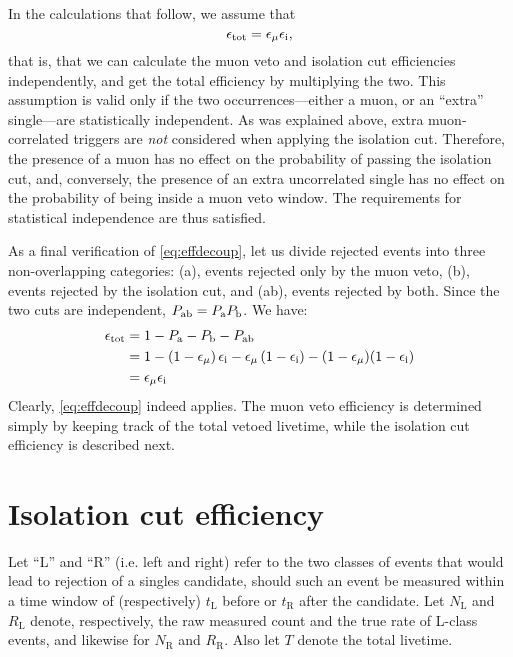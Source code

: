 \documentclass[../thesis.tex]{subfiles}
\begin{document}
In the calculations that follow, we assume that
\begin{equation}
  \label{eq:effdecoup}
  \epsilon_\mathrm{tot} = \epsilon_\mathrm{\mu} \epsilon_\mathrm{i},
\end{equation}
that is, that we can calculate the muon veto and isolation cut efficiencies
independently, and get the total efficiency by multiplying the two. This
assumption is valid only if the two occurrences---either a muon, or an ``extra''
single---are statistically independent. As was explained above, extra
muon-correlated triggers are \emph{not} considered when applying the isolation
cut. Therefore, the presence of a muon has no effect on the probability of
passing the isolation cut, and, conversely, the presence of an extra
uncorrelated single has no effect on the probability of being inside a muon veto
window. The requirements for statistical independence are thus satisfied.

As a final verification of \autoref{eq:effdecoup}, let us divide rejected events
into three non-overlapping categories: (a), events rejected only by the muon
veto, (b), events rejected by the isolation cut, and (ab), events rejected by
both. Since the two cuts are independent, $P_\mathrm{ab} = P_\mathrm{a}P_\mathrm{b}$. We have:
\begin{align*}
  \epsilon_\mathrm{tot} &= 1 - P_\mathrm{a} - P_\mathrm{b} - P_\mathrm{ab} \\
        &= 1 - (1-\epsilon_\mathrm{\mu})\,\epsilon_\mathrm{i} - \epsilon_\mathrm{\mu}\,(1-\epsilon_\mathrm{i}) - (1-\epsilon_\mathrm{\mu})(1-\epsilon_\mathrm{i}) \\
        &= \epsilon_\mathrm{\mu} \epsilon_\mathrm{i}
\end{align*}
Clearly, \autoref{eq:effdecoup} indeed applies. The muon veto efficiency is
determined simply by keeping track of the total vetoed livetime, while the
isolation cut efficiency is described next.


\section{Isolation cut efficiency}
\label{sec:isolcuteff}

\newcommand\NL{\ensuremath{N_{\mathrm{L}}}}
\newcommand\RL{\ensuremath{R_{\mathrm{L}}}}
\newcommand\tL{\ensuremath{t_{\mathrm{L}}}}
\newcommand\NR{\ensuremath{N_{\mathrm{R}}}}
\newcommand\RR{\ensuremath{R_{\mathrm{R}}}}
\newcommand\tR{\ensuremath{t_{\mathrm{R}}}}

Let ``L'' and ``R'' (i.e. left and right) refer to the two classes of events that would lead to rejection of a singles candidate, should such an event be measured within a time window of (respectively) $\tL$ before or $\tR$ after the candidate. Let $\NL$ and $\RL$ denote, respectively, the raw measured count and the true rate of L-class events, and likewise for $\NR$ and $\RR$. Also let $T$ denote the total livetime.
\end{document}

